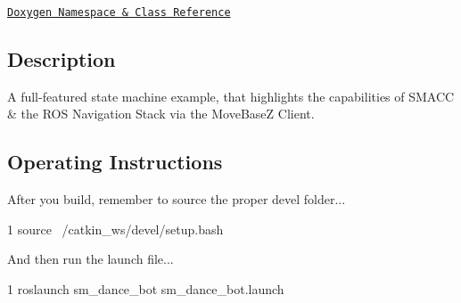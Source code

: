 \href{https://reelrbtx.github.io/SMACC/master/html/namespacesm__dance__bot.html}{\tt Doxygen Namespace \& Class Reference}

\subsection*{Description}

A full-\/featured state machine example, that highlights the capabilities of S\+M\+A\+CC \& the R\+OS Navigation Stack via the Move\+BaseZ Client. \subsection*{Operating Instructions}

After you build, remember to source the proper devel folder...


\begin{DoxyCode}
1 source ~/catkin\_ws/devel/setup.bash
\end{DoxyCode}


And then run the launch file...


\begin{DoxyCode}
1 roslaunch sm\_dance\_bot sm\_dance\_bot.launch
\end{DoxyCode}
 